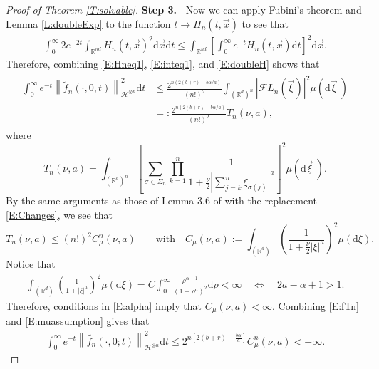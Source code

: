 \documentclass[a4paper,11pt]{article}
\numberwithin{equation}{section}
\numberwithin{equation}{section}
\theoremstyle{plain}
\theoremstyle{definition}
\newcommand{\ud}{\ensuremath{\mathrm{d} }}
\newcommand{\Norm}[1]{\left\|  #1   \right\|}
\newcommand{\R}{\mathbb{R}}
\begin{document}
\begin{proof}[Proof of Theorem \ref{T:solvable}]
  {\bigskip\bf\noindent Step 3.~}%
  Now we can apply Fubini's theorem and Lemma \ref{L:doubleExp} to the function $t\to
  H_n(t,\vec{x})$ to see that
  \begin{align} \label{E:doubleH}
    \int_0^\infty 2e^{-2t} \int_{\R^{nd}} H_n(t,\vec{x})^2 \ud \vec{x} \ud t
    \le \int_{\R^{nd}} \left[ \int_0^\infty e^{-t} H_n(t,\vec{x}) \ud t\right ]^2 \ud \vec{x}.
  \end{align}
  Therefore, combining \eqref{E:Hneq1}, \eqref{E:inteq1}, and \eqref{E:doubleH} shows that
  \begin{align} \label{E:fTn}
    \begin{aligned}
      \int_0^\infty e^{-t} \Norm{ \widetilde{f}_n(\cdot,0,t) }_{\mathcal{H}^{\otimes n}}^2 \ud t
      & \le \frac{2^{n(2(b+r) - b\alpha/a)}}{(n!)^2} \int_{(\R^d)^n} | \mathcal{F}L_n(\vec{\xi}) |^2 \mu(\ud \vec{\xi}\:) \\
      & =: \frac{2^{n(2(b+r) - b\alpha/a)}}{(n!)^2} T_n(\nu,a),
    \end{aligned}
  \end{align}
  where
  \begin{equation} \label{E:Tn}
    T_n(\nu,a) = \int_{(\R^d)^n} \left[\sum_{\sigma \in \Sigma_n} \prod_{k=1}^n \frac{1}{1+\frac{\nu}{2}\left|\sum_{j=k}^n \xi_{\sigma(j)} \right|^a}\right]^2 \mu(\ud \vec{\xi}\:).
  \end{equation}
  By the same arguments as those of Lemma 3.6 of \cite{BCC21} with the replacement
  \eqref{E:Changes}, we see that
  \begin{equation} \label{E:muassumption}
    T_n(\nu, a) \le (n!)^2 C_\mu^n(\nu, a)
    \qquad \text{with} \quad
    C_\mu(\nu,a) := \int_{(\R^d)} \left(\frac{1}{1+\frac{\nu}{2}|\xi|^a}\right)^2 \mu(\ud \xi).
  \end{equation}
  Notice that
  \begin{align}
    \label{E:alpha2}
    \int_{(\R^d)} \left(\frac{1}{1+|\xi|^a}\right)^2 \mu(\ud \xi)
    = C \int_0^\infty \frac{\rho^{\alpha-1}}{(1+\rho^{a})^2} \ud \rho<\infty
    \quad \Longleftrightarrow \quad
    2a - \alpha +1 > 1.
  \end{align}
  Therefore, conditions in \eqref{E:alpha} imply that $C_{\mu}(\nu,a)<\infty$.
  Combining \eqref{E:fTn} and \eqref{E:muassumption} gives that
  \begin{align} \label{E:LNfnineq}
    \int_0^\infty e^{-t} \Norm{\widetilde{f_n}(\cdot,0;t)}_{ \mathcal{H}^{ \otimes n } }^2 \ud t
    \le 2^{n\left[2(b+r)-\frac{b\alpha}{a}\right]} C_\mu^n(\nu,a)<+\infty.
  \end{align}


\end{proof}
\end{document}
